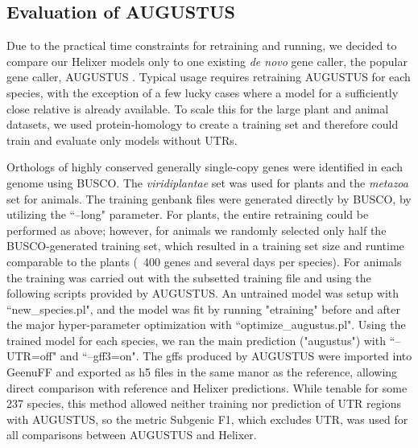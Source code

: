 \documentclass{bioinfo}
\begin{document}
\begin{methods}
\subsection{Evaluation of AUGUSTUS} 
\label{sec:augustus}
Due to the practical time constraints for retraining and running, we decided to compare our Helixer
models only to one existing {\it de novo} gene caller, the popular gene caller, AUGUSTUS \citep{stanke2003gene}.
Typical usage requires retraining AUGUSTUS for each species, with the exception of a
few lucky cases where a model for a sufficiently close relative is already available. To scale this for 
the large plant and animal datasets, we used protein-homology to create a training set and
therefore could train and evaluate only models without UTRs. 

Orthologs of highly conserved generally single-copy genes were identified in each genome using
BUSCO. The {\it viridiplantae} set was used for plants and the {\it metazoa} set for animals.
The training genbank files were generated directly by BUSCO, by utilizing the ``--long"  %
parameter. For plants, the entire retraining could be performed as above; however, for animals
we randomly selected only half the BUSCO-generated training set, which resulted in a training set 
size and runtime comparable to the plants (~400 genes and several days per species). For animals
the training was carried out with the subsetted training file and using the following scripts provided
by AUGUSTUS. An untrained model was setup with ``new\_species.pl", and the model was fit by running
"etraining" before and after the major hyper-parameter optimization with ``optimize\_augustus.pl".
Using the trained model for each species, we ran the main prediction ("augustus") with ``--UTR=off"
and ``--gff3=on". The gffs produced by AUGUSTUS were imported into GeenuFF and exported as h5
files in the same manor as the reference, allowing direct comparison with reference and 
Helixer predictions. While tenable for some 237 species, this method allowed neither training
nor prediction of UTR regions with AUGUSTUS, so the metric Subgenic F1, which excludes UTR,
was used for all comparisons between AUGUSTUS and Helixer.


\end{methods}
\end{document}
